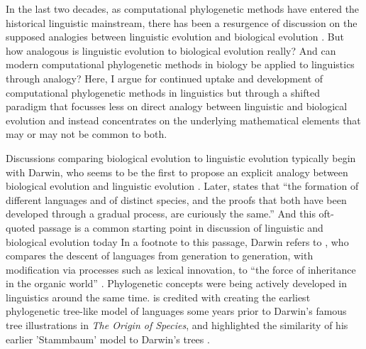 In the last two decades, as computational phylogenetic methods have entered the historical linguistic mainstream, there has been a resurgence of discussion on the supposed analogies between linguistic evolution and biological evolution \autocite[e.g.][]{atkinson_curious_2005}. But how analogous is linguistic evolution to biological evolution really? And can modern computational phylogenetic methods in biology be applied to linguistics through analogy? Here, I argue for continued uptake and development of computational phylogenetic methods in linguistics but through a shifted paradigm that focusses less on direct analogy between linguistic and biological evolution and instead concentrates on the underlying mathematical elements that may or may not be common to both.

Discussions comparing biological evolution to linguistic evolution typically begin with Darwin, who seems to be the first to propose an explicit analogy between biological evolution and linguistic evolution \autocite[p.~422]{darwin_origin_1859}. Later, \textcite[p.~57]{darwin_descent_1871} states that ``the formation of different languages and of distinct species, and the proofs that both have been developed through a gradual process, are curiously the same.'' And this oft-quoted passage is a common starting point in discussion of linguistic and biological evolution today \autocites[e.g.][]{atkinson_curious_2005}{bromham_curiously_2017}{mesoudi_pursuing_2017} In a footnote to this passage, Darwin refers to \textcite[ch.~13]{lyell_geological_1863}, who compares the descent of languages from generation to generation, with modification via processes such as lexical innovation, to ``the force of inheritance in the organic world'' \autocite[p.~457]{lyell_geological_1863}. Phylogenetic concepts were being actively developed in linguistics around the same time. \textcite{schleicher_ersten_1853} is credited with creating the earliest phylogenetic tree-like model of languages some years prior to Darwin's famous tree illustrations in \emph{The Origin of Species}, and highlighted the similarity of his earlier 'Stammbaum' model to Darwin's trees \autocite{schleicher_darwinsche_1863}.


